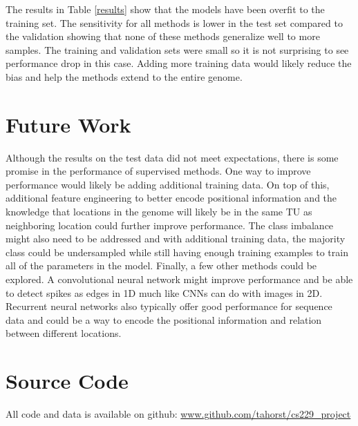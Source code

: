 \documentclass{article}
\begin{document}
The results in Table \ref{results} show that the models have been overfit to the training set.  The sensitivity for all methods is lower in the test set compared to the validation showing that none of these methods generalize well to more samples.  The training and validation sets were small so it is not surprising to see performance drop in this case.  Adding more training data would likely reduce the bias and help the methods extend to the entire genome.

\section{Future Work}
Although the results on the test data did not meet expectations, there is some promise in the performance of supervised methods.  One way to improve performance would likely be adding additional training data.  On top of this, additional feature engineering to better encode positional information and the knowledge that locations in the genome will likely be in the same TU as neighboring location could further improve performance.  The class imbalance might also need to be addressed and with additional training data, the majority class could be undersampled while still having enough training examples to train all of the parameters in the model.  Finally, a few other methods could be explored.  A convolutional neural network might improve performance and be able to detect spikes as edges in 1D much like CNNs can do with images in 2D.  Recurrent neural networks also typically offer good performance for sequence data and could be a way to encode the positional information and relation between different locations.

\newpage
\section*{Source Code}
\large{\faGithub} \normalsize \hspace{4pt} All code and data is available on github: \url{www.github.com/tahorst/cs229\_project}
\end{document}
